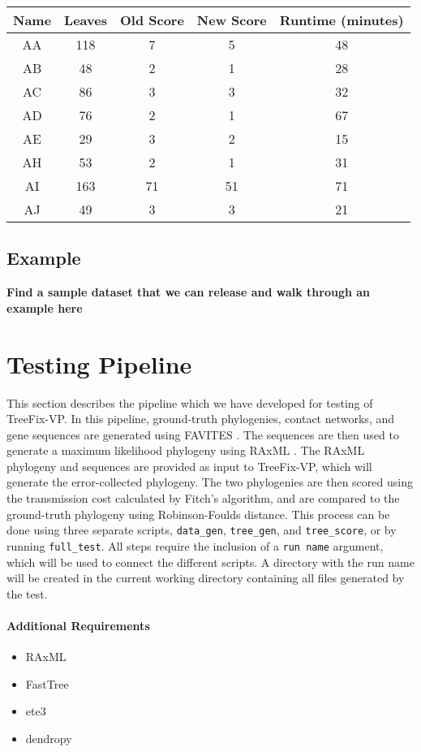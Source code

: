 \documentclass[11pt]{article}
\begin{document}
\vspace{5mm}
\begin{tabular}{ |c|c|c|c|c| }
    \hline
    \textbf{Name} & \textbf{Leaves} & \textbf{Old Score} & \textbf{New Score} & \textbf{Runtime (minutes)} \\
    \hline
    AA & 118 & 7 & 5 & 48 \\
    \hline
    AB & 48 & 2 & 1 & 28 \\
    \hline
    AC & 86 & 3 & 3 & 32 \\
    \hline
    AD & 76 & 2 & 1 & 67 \\
    \hline
    AE & 29 & 3 & 2 & 15 \\
    \hline
    AH & 53 & 2 & 1 & 31 \\
    \hline
    AI & 163 & 71 & 51 & 71 \\
    \hline
    AJ & 49 & 3 & 3 & 21 \\
    \hline
\end{tabular}

\subsection{Example}
\textbf{Find a sample dataset that we can release and walk through
an example here}

\section{Testing Pipeline}
This section describes the pipeline which we have developed for testing of TreeFix-VP. In this pipeline, ground-truth phylogenies, contact networks, and gene sequences are generated using FAVITES \cite{favites}. The sequences are then used to generate a maximum likelihood phylogeny using RAxML \cite{raxml}. The RAxML phylogeny and sequences are provided as input to TreeFix-VP, which will generate the error-collected phylogeny. The two phylogenies are then scored using the transmission cost calculated by Fitch's algorithm, and are compared to the ground-truth phylogeny using Robinson-Foulds distance. This process can be done using three separate scripts, \texttt{data\_gen}, \texttt{tree\_gen}, and \texttt{tree\_score}, or by running \texttt{full\_test}. All steps require the inclusion of a \texttt{run name} argument, which will be used to connect the different scripts. A directory with the run name will be created in the current working directory containing all files generated by the test.

\paragraph{Additional Requirements}
\begin{itemize}
    \item RAxML
    \item FastTree
    \item ete3
    \item dendropy 
\end{itemize}
\end{document}
